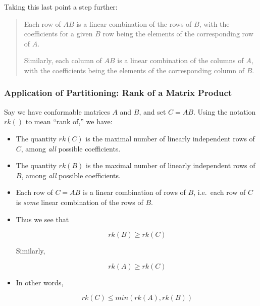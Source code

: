 Taking this last point a step further:

\begin{quote}

Each row of $AB$ is a linear combination of the rows of $B$, with the
coefficients for a given $B$ row being the elements of the 
corresponding row of $A$.

Similarly, each column of $AB$ is a linear combination of the columns of
$A$, with the coefficients being the elements of the corresponding
column of $B$.

\end{quote}

\subsubsection{Application of Partitioning:  Rank of a Matrix Product}

Say we have conformable matrices $A$ and $B$, and set $C = AB$.  Using
the notation $rk()$ to mean ``rank of,'' we have:

\begin{itemize}

\item The quantity $rk(C)$ is the maximal number of linearly independent
rows of $C$, among \textit{all} possible coefficients.

\item The quantity $rk(B)$ is the maximal number of linearly independent
rows of $B$, among \textit{all} possible coefficients.

\item Each row of $C = AB$ is a linear combination of rows of $B$,
i.e.\ each row of $C$ is \textit{some} linear combination of the rows of
$B$.

\item Thus we see that 

\begin{equation}
rk(B) \geq rk(C)
\end{equation}

Similarly,

\begin{equation}
rk(A) \geq rk(C)
\end{equation}

\item In other words,

\begin{equation}
rk(C) \leq min(rk(A),rk(B))
\end{equation}

\end{itemize} 

